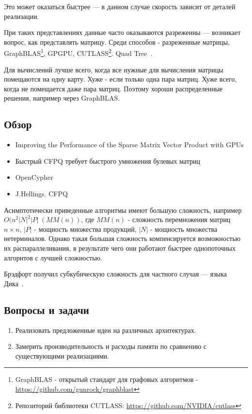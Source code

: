 Это может оказаться быстрее --- в данном случае скорость зависит от деталей реализации.

При таких представлениях данные часто оказываются разреженны --- возникает вопрос, как представлять матрицу. Среди способов - разреженные матрицы, GraphBLAS\footnote{GraphBLAS - открытый стандарт для графовых алгоритмов - \url{https://github.com/gunrock/graphblast} }, GPGPU, CUTLASS\footnote{Репозиторий библиотеки CUTLASS: \url{https://github.com/NVIDIA/cutlass}}.
Quad Tree~\cite{quadtree}.

Для вычислений лучше всего, когда все нужные для вычисления матрицы помещаются на одну карту. Хуже - если только одна пара матриц. Хуже всего, когда не помещается даже пара матриц. Поэтому хороши распределенные решения, например через GraphBLAS.

\subsection{Обзор}
\begin{itemize}
	\item Improving the Performance of the Sparse Matrix Vector Product with GPUs~\cite{sparseperformance}
	\item Быстрый CFPQ требует быстрого умножения булевых матриц~\cite{Lee:2002:FCG:505241.505242}
	\item OpenCypher~\cite{Kuijpers:2019:ESC:3335783.3335791}
	\item J.Hellings. CFPQ~\cite{hellings2015querying}
\end{itemize}

Асимптотически приведенные алгоритмы имеют большую сложность, например \\ $O(n^2 |N|^2|P|~ (MM(n))$, где $MM(n)$ - сложность перемножения матриц $n \times n$, $|P|$ - мощность множества продукций, $|N|$ - мощность множества нетерминалов. Однако такая большая сложность компенсируется возможностью их распараллеливания, в результате чего они работают быстрее однопоточных алгоритов с лучшей сложностью.

Брэдфорт получил субкубическую сложность для частного случая --- языка Дика~\cite{8249039}.

\subsection{Вопросы и задачи}
\begin{enumerate}
  \item Реализовать предложенные идеи на различных архитектурах.
  \item Замерить производительность и расходы памяти по сравнению с существующими реализациями.
\end{enumerate}
